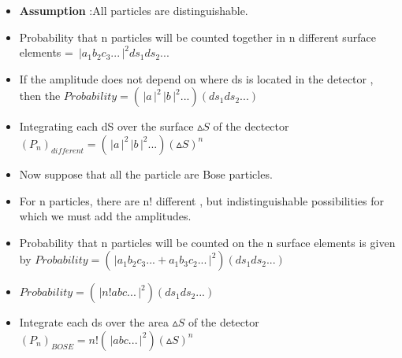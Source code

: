 \documentclass[aspectratio=169]{beamer}
\begin{document}
\begin{frame}

	\begin{itemize}
	
		\item \textbf{Assumption} :All particles are distinguishable. \newline
		\item Probability that n particles will be counted together in n different surface elements = $\,\Bigr\rvert a_{1}b_{2}c_{3}... \,\Bigr\rvert^{2}ds_{1}ds_{2}...$ \newline
		\item If the amplitude does not depend on where ds is located in the detector , then the \newline
		$Probability = \left(\,\Bigr\rvert a \,\Bigr\rvert^{2}\,\Bigr\rvert b \,\Bigr\rvert^{2}...\right)(ds_{1}ds_{2}...)$
		
	\end{itemize}
	
\end{frame} 

\begin{frame}

	\begin{itemize}
	
		\item Integrating each dS over the surface $\vartriangle S$ of the dectector \newline 
		$(P_{n})_{different} = \left(\,\Bigr\rvert a \,\Bigr\rvert^{2}\,\Bigr\rvert b \,\Bigr\rvert^{2}...\right)(\vartriangle S)^{n}$ \newline
		\item Now suppose that all the particle are Bose particles.
		\item For n particles, there are n! different , but indistinguishable  possibilities for which we must add the amplitudes.
		
	\end{itemize}
	
\end{frame}

\begin{frame}

	\begin{itemize}
	
	\item Probability that n particles will be counted on the n surface elements is given by \newline $Probability = \left(\,\Bigr\rvert a_{1}b_{2}c_{3}... + a_{1}b_{3}c_{2}... \,\Bigr\rvert^{2}\right)(ds_{1}ds_{2}...)$
	\item $Probability = \left(\,\Bigr\rvert n!abc... \,\Bigr\rvert^{2}\right)(ds_{1}ds_{2}...)$
	\item Integrate each ds over the area $\vartriangle S$ of the detector \newline
	$(P_{n})_{BOSE} = n!\left(\,\Bigr\rvert abc... \,\Bigr\rvert^{2}\right)(\vartriangle S)^{n}$
	
	\end{itemize}

\end{frame}
\end{document}
